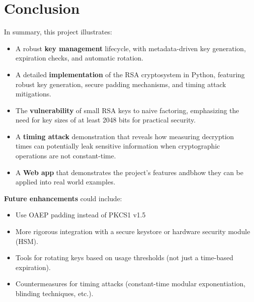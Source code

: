 \documentclass[12pt]{article}
\begin{document}
\section{Conclusion}

In summary, this project illustrates:
\begin{itemize}
    \item A robust \textbf{key management} lifecycle, with metadata-driven key generation, expiration checks, and automatic rotation.
    \item A detailed \textbf{implementation} of the RSA cryptosystem in Python, featuring robust key generation, secure padding mechanisms, and timing attack mitigations.
    \item The \textbf{vulnerability} of small RSA keys to naive factoring, emphasizing the need for key sizes of at least 2048 bits for practical security.
    \item A \textbf{timing attack} demonstration that reveals how measuring decryption times can potentially leak sensitive information when cryptographic operations are not constant-time.
    \item A \textbf{Web app} that demonstrates the project's features andbhow they can be applied into real world examples.
\end{itemize}

\noindent
\textbf{Future enhancements} could include:
\begin{itemize}
    \item Use OAEP padding instead of PKCS1 v1.5
    \item More rigorous integration with a secure keystore or hardware security module (HSM).
    \item Tools for rotating keys based on usage thresholds (not just a time-based expiration).
    \item Countermeasures for timing attacks (constant-time modular exponentiation, blinding techniques, etc.).
\end{itemize}
\end{document}
